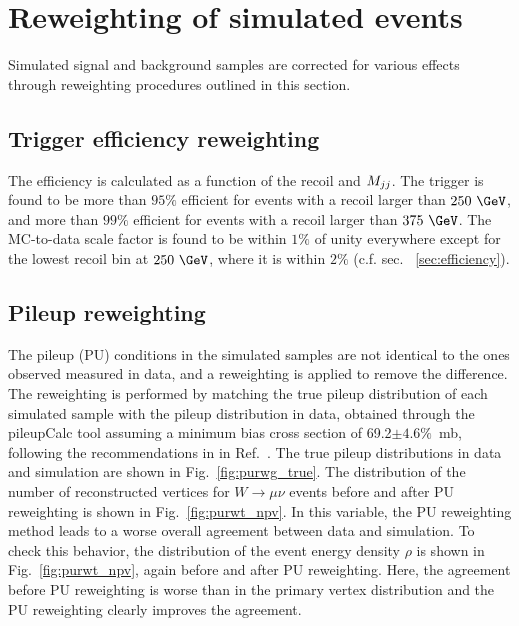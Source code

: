 \section{Reweighting of simulated events} \label{sec:reweighting}

Simulated signal and background samples are corrected for various effects through reweighting procedures outlined in this section.

\subsection{Trigger efficiency reweighting}

The efficiency is calculated as a function of the recoil and $M_{jj}$.
The trigger is found to be more than $95\%$ efficient for events with a recoil larger than $250~\GeV$, and more than $99\%$ 
efficient for events with a recoil larger than $375~\GeV$. The MC-to-data scale factor is found to be within $1\%$ of unity 
everywhere except for the lowest recoil bin at $250~\GeV$, where it is within $2\%$ (c.f. sec. ~\ref{sec:efficiency}). 

\subsection{Pileup reweighting}

The pileup (PU) conditions in the simulated samples are not identical to the ones observed measured in data, and a reweighting is applied to remove the difference.
The reweighting is performed by matching the true pileup distribution of each simulated sample
with the pileup distribution in data, obtained through the pileupCalc tool
assuming a minimum bias cross section of 69.2$\pm 4.6\%$~mb, following the recommendations in in Ref.~\cite{pileup_twiki}. The true pileup distributions in data and simulation are shown in Fig.~\ref{fig:purwg_true}. The distribution of the number of reconstructed vertices for $W\to \mu\nu$ events before and after PU reweighting is shown in Fig.~\ref{fig:purwt_npv}. In this variable, the PU reweighting method leads to a worse overall agreement between data and simulation. To check this behavior, the distribution of the event energy density $\rho$ is shown in Fig.~\ref{fig:purwt_npv}, again before and after PU reweighting. Here, the agreement before PU reweighting is worse than in the primary vertex distribution and the PU reweighting clearly improves the agreement.

